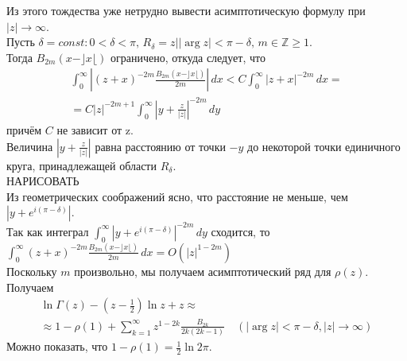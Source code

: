 \documentclass{report}
\begin{document}
Из этого тождества уже нетрудно вывести асимптотическую формулу при $|z|\to\infty$. \\
Пусть $\delta=const: 0<\delta<\pi,\,R_\delta={z| |\arg{z}|<\pi-\delta},\,m\in\mathbb{Z}\geq{1}$. \\
Тогда $B_{2m}(x-\rfloor{x}\lfloor)$ ограничено, откуда следует, что \\
\begin{multline}
\int_{0}^{\infty}\left|(z+x)^{-2m}\frac{B_{2m}(x-\rfloor{x}\lfloor)}{2m}\right|\,dx<C\int_{0}^{\infty}|z+x|^{-2m}\,dx=\\
=C|z|^{-2m+1}\int_{0}^{\infty}\left|y+\frac{z}{|z|}\right|^{-2m}\,dy
\end{multline}
причём $C$ не зависит от z. \\
Величина $\left|y+\frac{z}{|z|}\right|$ равна расстоянию от точки $-y$ до некоторой точки единичного круга, принадлежащей области $R_\delta$. \\
НАРИСОВАТЬ \\
Из геометрических соображений ясно, что расстояние не меньше, чем $\left|y+e^{i(\pi-\delta)}\right|$. \\
Так как интеграл $\int_{0}^{\infty}\left|y+e^{i(\pi-\delta)}\right|^{-2m}\,dy$ сходится, то \\
$\int_{0}^{\infty}(z+x)^{-2m}\frac{B_{2m}(x-\rfloor{x}\lfloor)}{2m}\,dx=O(|z|^{1-2m})$ \\
Поскольку $m$ произвольно, мы получаем асимптотический ряд для $\rho(z)$. Получаем \\
\begin{multline}
\ln\Gamma(z)-\left(z-\frac{1}{2}\right)\ln{z}+z\approx \\
\approx 1-\rho(1)+\sum_{k=1}^{\infty}z^{1-2k}\frac{B_{2k}}{2k(2k-1)}\quad(|\arg{z}|<\pi-\delta, |z|\to\infty)
\end{multline}
Можно показать, что $1-\rho(1)=\frac{1}{2}\ln{2\pi}$.
\newpage
\end{document}
